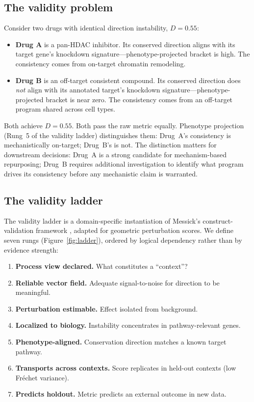 \documentclass[10pt]{article}
\begin{document}
\subsection{The validity problem}

Consider two drugs with identical direction instability, $D = 0.55$:

\begin{itemize}
  \item \textbf{Drug A} is a pan-HDAC inhibitor. Its conserved direction
    aligns with its target gene's knockdown signature---phenotype-projected
    bracket is high. The consistency comes from on-target chromatin
    remodeling.
  \item \textbf{Drug B} is an off-target consistent compound. Its conserved
    direction does \emph{not} align with its annotated target's knockdown
    signature---phenotype-projected bracket is near zero. The consistency
    comes from an off-target program shared across cell types.
\end{itemize}

Both achieve $D = 0.55$. Both pass the raw metric equally. Phenotype
projection (Rung~5 of the validity ladder) distinguishes them: Drug~A's
consistency is mechanistically on-target; Drug~B's is not. The distinction
matters for downstream decisions: Drug~A is a strong candidate for
mechanism-based repurposing; Drug~B requires additional investigation to
identify what program drives its consistency before any mechanistic claim
is warranted.

\subsection{The validity ladder}

The validity ladder is a domain-specific instantiation of Messick's
construct-validation framework \citep{messick1995validity}, adapted for
geometric perturbation scores. We define seven rungs
(Figure~\ref{fig:ladder}), ordered by logical dependency rather than by
evidence strength:

\begin{enumerate}
  \item \textbf{Process view declared.} What constitutes a ``context''?
  \item \textbf{Reliable vector field.} Adequate signal-to-noise for
    direction to be meaningful.
  \item \textbf{Perturbation estimable.} Effect isolated from background.
  \item \textbf{Localized to biology.} Instability concentrates in
    pathway-relevant genes.
  \item \textbf{Phenotype-aligned.} Conservation direction matches a
    known target pathway.
  \item \textbf{Transports across contexts.} Score replicates in held-out
    contexts (low Fr\'echet variance).
  \item \textbf{Predicts holdout.} Metric predicts an external outcome
    in new data.
\end{enumerate}
\end{document}
